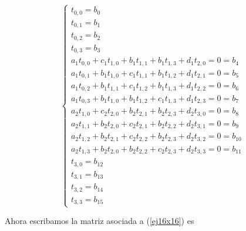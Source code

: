 \begin{equation}
\label{ej16x16}
  \left\lbrace
  \begin{array}{l}
     t_{0,0} = b_0 \\
     t_{0,1} = b_1 \\
     t_{0,2} = b_2 \\
     t_{0,3} = b_3 \\
		 a_1 t_{0,0} + c_1 t_{1,0} + b_1 t_{1, 1} + b_1 t_{1, 3} + d_1 t_{2,0} 		= 0 = b_{4}	\\
		 a_1 t_{0,1} + b_1 t_{1,0} + c_1 t_{1,1} + b_1 t_{1,2} + d_1 t_{2,1} 		 	= 0 = b_{5}	\\
	   a_1 t_{0,2} + b_1 t_{1,1} + c_1 t_{1,2} + b_1 t_{1,3} + d_1 t_{2,2} 			= 0 = b_{6}	\\
		 a_1 t_{0,3} + b_1 t_{1,0} + b_1 t_{1,2} + c_1 t_{1,3} + d_1 t_{2,3} 			= 0 = b_{7}	\\
		 a_2 t_{1,0} + c_2 t_{2,0} + b_2 t_{2,1} + b_2 t_{2,3} + d_2 t_{3,0}			= 0 = b_{8}	\\
		 a_2 t_{1,1} + b_2 t_{2,0} + c_2 t_{2,1} + b_2 t_{2,2} + d_2 t_{3,1} 		 	= 0 = b_{9}	\\
	   a_2 t_{1,2} + b_2 t_{2,1} + c_2 t_{2,2} + b_2 t_{2,3} + d_2 t_{3,2} 			= 0 = b_{10}	\\
		 a_2 t_{1,3} + b_2 t_{2,0} + b_2 t_{2,2} + c_2 t_{2,3} + d_2 t_{3,3} 			= 0 = b_{11}	\\
     t_{3,0} = b_{12} \\
     t_{3,1} = b_{13} \\
     t_{3,2} = b_{14} \\
     t_{3,3} = b_{15}     		 
  \end{array}
  \right.
\end{equation}

Ahora escribamos la matriz asociada a (\ref{ej16x16}) es \vspace{1em}

